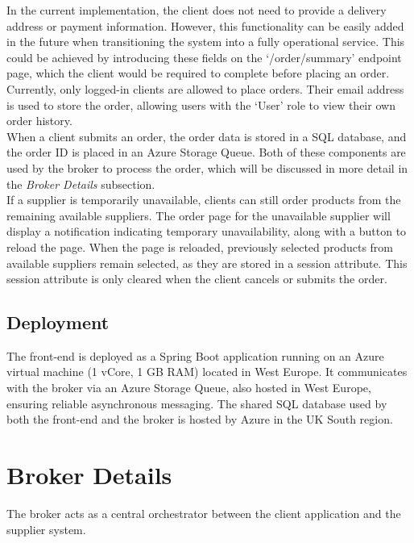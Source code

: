 \documentclass[10pt,a4paper,kul]{kulakarticle} %
\begin{document}
	\noindent In the current implementation, the client does not need to provide a delivery address or payment information. However, this functionality can be easily added in the future when transitioning the system into a fully operational service. This could be achieved by introducing these fields on the `/order/summary' endpoint page, which the client would be required to complete before placing an order. Currently, only logged-in clients are allowed to place orders. Their email address is used to store the order, allowing users with the `User' role to view their own order history.\\
	\newline
	When a client submits an order, the order data is stored in a SQL database, and the order ID is placed in an Azure Storage Queue. Both of these components are used by the broker to process the order, which will be discussed in more detail in the \textit{Broker Details} subsection.\\
	\newline
	If a supplier is temporarily unavailable, clients can still order products from the remaining available suppliers. The order page for the unavailable supplier will display a notification indicating temporary unavailability, along with a button to reload the page. When the page is reloaded, previously selected products from available suppliers remain selected, as they are stored in a session attribute. This session attribute is only cleared when the client cancels or submits the order.
	
	\subsection{Deployment}
	The front-end is deployed as a Spring Boot application running on an Azure virtual machine (1 vCore, 1 GB RAM) located in West Europe. It communicates with the broker via an Azure Storage Queue, also hosted in West Europe, ensuring reliable asynchronous messaging. The shared SQL database used by both the front-end and the broker is hosted by Azure in the UK South region.
	
	\section{Broker Details}
		The broker acts as a central orchestrator between the client application and the supplier system. 
\end{document}
